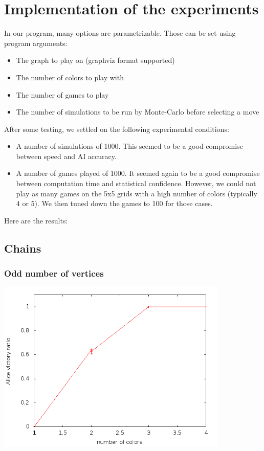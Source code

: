\section{Implementation of the experiments}


In our program, many options are parametrizable. Those can be set using program arguments:
\begin{itemize}
\item The graph to play on (graphviz format supported)
\item The number of colors to play with
\item The number of games to play
\item The number of simulations to be run by Monte-Carlo before selecting a move
\end{itemize}
After some testing, we settled on the following experimental conditions:
\begin{itemize}
\item A number of simulations of 1000. This seemed to be a good compromise between speed and AI accuracy.
\item A number of games played of 1000. It seemed again to be a good compromise between computation time and statistical confidence. However, we could not play as many games on the 5x5 grids with a high number of colors (typically 4 or 5). We then tuned down the games to 100 for those cases. 
\end{itemize}

Here are the results:\\

\subsection{Chains}

\subsubsection{Odd number of vertices}

\includegraphics[width=11cm]{resultats/chaineimpaire.png}

